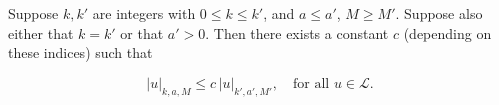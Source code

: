 Suppose $k, k'$ are integers with $0 \leq k \leq k'$, and $a \leq a'$, $M \geq M'$. Suppose also either that $k = k'$ or that $a' > 0$. Then there exists a constant $c$ (depending on these indices) such that

$$|u|_{k,a,M} \leq c \, |u|_{k',a',M'}, \quad \text{for all } u \in \mathcal{L}.$$
